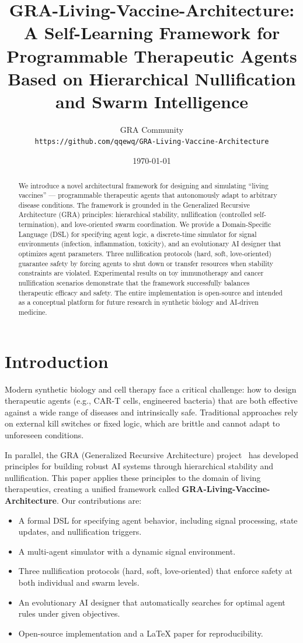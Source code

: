 \documentclass[12pt,a4paper]{article}
\title{GRA-Living-Vaccine-Architecture: \\ A Self-Learning Framework for Programmable Therapeutic Agents \\ Based on Hierarchical Nullification and Swarm Intelligence}
\author{GRA Community \\ \texttt{https://github.com/qqewq/GRA-Living-Vaccine-Architecture}}
\date{\today}
\begin{document}
\maketitle

\begin{abstract}
We introduce a novel architectural framework for designing and simulating ``living vaccines'' --- programmable therapeutic agents that autonomously adapt to arbitrary disease conditions. The framework is grounded in the Generalized Recursive Architecture (GRA) principles: hierarchical stability, nullification (controlled self-termination), and love-oriented swarm coordination. We provide a Domain-Specific Language (DSL) for specifying agent logic, a discrete-time simulator for signal environments (infection, inflammation, toxicity), and an evolutionary AI designer that optimizes agent parameters. Three nullification protocols (hard, soft, love-oriented) guarantee safety by forcing agents to shut down or transfer resources when stability constraints are violated. Experimental results on toy immunotherapy and cancer nullification scenarios demonstrate that the framework successfully balances therapeutic efficacy and safety. The entire implementation is open-source and intended as a conceptual platform for future research in synthetic biology and AI-driven medicine.
\end{abstract}

\section{Introduction}
Modern synthetic biology and cell therapy face a critical challenge: how to design therapeutic agents (e.g., CAR-T cells, engineered bacteria) that are both effective against a wide range of diseases and intrinsically safe. Traditional approaches rely on external kill switches or fixed logic, which are brittle and cannot adapt to unforeseen conditions. 

In parallel, the GRA (Generalized Recursive Architecture) project~\cite{gra-core, gra-love, gra-swarm} has developed principles for building robust AI systems through hierarchical stability and nullification. This paper applies these principles to the domain of living therapeutics, creating a unified framework called \textbf{GRA-Living-Vaccine-Architecture}. Our contributions are:
\begin{itemize}
    \item A formal DSL for specifying agent behavior, including signal processing, state updates, and nullification triggers.
    \item A multi-agent simulator with a dynamic signal environment.
    \item Three nullification protocols (hard, soft, love-oriented) that enforce safety at both individual and swarm levels.
    \item An evolutionary AI designer that automatically searches for optimal agent rules under given objectives.
    \item Open-source implementation and a LaTeX paper for reproducibility.
\end{itemize}
\end{document}
